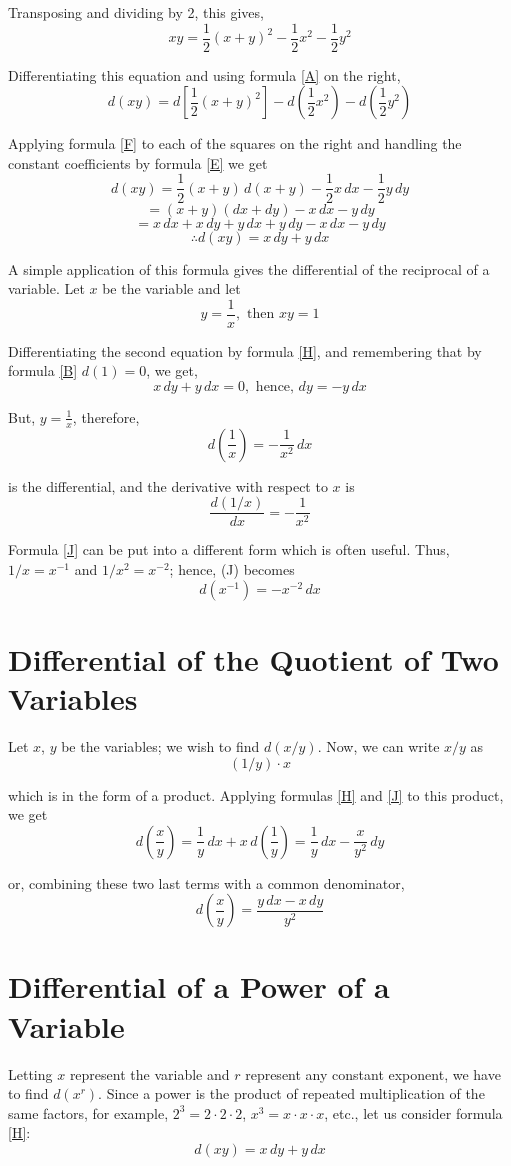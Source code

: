 Transposing and dividing by 2, this gives,
\[xy = \frac{1}{2}(x+y)^2 - \frac{1}{2}x^2 - \frac{1}{2}y^2\]

Differentiating this equation and using formula \eqref{A} on the right,
\[d(xy) = d[\frac{1}{2}(x+y)^2] - d(\frac{1}{2}x^2) - d(\frac{1}{2}y^2)\]

Applying formula \eqref{F} to each of the squares on the right and handling the constant coefficients by formula \eqref{E} we get
\[d(xy) = \frac{1}{2}(x + y)\,d(x + y) - \frac{1}{2}x\,dx - \frac{1}{2}y\,dy\]
\[= (x+y)(dx+dy) - x\,dx - y\,dy\]
\[= x\,dx + x\,dy + y\,dx + y\,dy - x\,dx - y\,dy\]
\[\therefore d(xy) = x\,dy + y\,dx \tag{H} \label{H}\]

A simple application of this formula gives the differential of the reciprocal of a variable. Let $x$ be the variable and let
\[y = \frac{1}{x}, \text{ then } xy = 1\]

Differentiating the second equation by formula \eqref{H}, and remembering that by formula \eqref{B} $d(1) = 0$, we get,
\[x\,dy + y\,dx = 0, \text{ hence, } dy = -y\,dx\]

But, $y = \frac{1}{x}$, therefore,
\[d(\frac{1}{x}) = -\frac{1}{x^2}\,dx \tag{J} \label{J}\]

is the differential, and the derivative with respect to $x$ is
\[\frac{d(1/x)}{dx} = -\frac{1}{x^2} \tag{26} \label{26}\]

Formula \eqref{J} can be put into a different form which is often useful. Thus, $1/x = x^{-1}$ and $1/x^2 = x^{-2}$; hence, (J) becomes
\[d(x^{-1}) = -x^{-2}\,dx \tag{27} \label{27}\]

\section{Differential of the Quotient of Two Variables}
Let $x$, $y$ be the variables; we wish to find $d(x/y)$. Now, we can write $x/y$ as
\[(1/y)\cdot x\]

which is in the form of a product. Applying formulas \eqref{H} and \eqref{J} to this product, we get
\[d(\frac{x}{y}) = \frac{1}{y}\,dx + x\,d(\frac{1}{y}) = \frac{1}{y}\,dx - \frac{x}{y^2}\,dy\]

or, combining these two last terms with a common denominator,
\[d(\frac{x}{y}) = \frac{y\,dx - x\,dy}{y^2} \tag{K} \label{K}\]

\section{Differential of a Power of a Variable}
Letting $x$ represent the variable and $r$ represent any constant exponent, we have to find $d(x^r)$. Since a power is the product of repeated multiplication of the same factors, for example, $2^3 = 2\cdot2\cdot2$, $x^3 = x\cdot x\cdot x$, etc., let us consider formula \eqref{H}:
\[d(xy) = x\,dy + y\,dx\]

